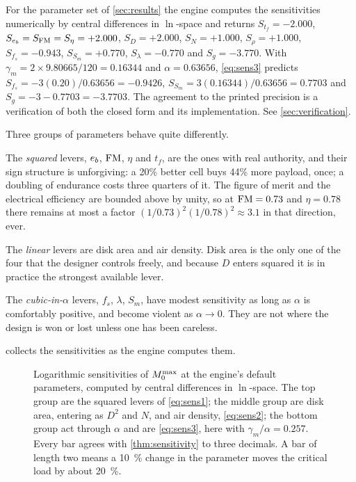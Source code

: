 \begin{example}
For the parameter set of \cref{sec:results} the engine computes the
sensitivities numerically by central differences in $\ln$-space and returns
$S_{t_f}=-2.000$, $S_{e_b}=S_{\mathrm{FM}}=S_{\eta}=+2.000$, $S_D=+2.000$, $S_N=+1.000$,
$S_\rho=+1.000$, $S_{f_s}=-0.943$, $S_{S_m}=+0.770$, $S_\lambda=-0.770$ and
$S_g=-3.770$. With $\gamma_m = 2\times 9.80665/120 = 0.16344$ and
$\alpha=0.63656$, \cref{eq:sens3} predicts
$S_{f_s} = -3(0.20)/0.63656 = -0.9426$,
$S_{S_m} = 3(0.16344)/0.63656 = 0.7703$ and
$S_g = -3-0.7703 = -3.7703$. The agreement to the printed precision is a
verification of both the closed form and its implementation. See
\cref{sec:verification}.
\end{example}

\begin{remark}
Three groups of parameters behave quite differently.

The \emph{squared} levers, $e_b$, $\mathrm{FM}$, $\eta$ and $t_f$, are the ones with
real authority, and their sign structure is unforgiving: a 20\% better cell
buys 44\% more payload, once; a doubling of endurance costs three quarters of
it. The figure of merit and the electrical efficiency are bounded above by
unity, so at $\mathrm{FM}=0.73$ and $\eta=0.78$ there remains at most a factor
$(1/0.73)^2(1/0.78)^2 \approx 3.1$ in that direction, ever.

The \emph{linear} levers are disk area and air density. Disk area is the only
one of the four that the designer controls freely, and because $D$ enters
squared it is in practice the strongest available lever.

The \emph{cubic-in-$\alpha$} levers, $f_s$, $\lambda$, $S_m$, have modest
sensitivity as long as $\alpha$ is comfortably positive, and become violent as
$\alpha\to0$. They are not where the design is won or lost unless one has been
careless.
\end{remark}

 collects the sensitivities as the engine computes them.

\begin{figure}[tbp]
\centering

\caption{Logarithmic sensitivities of $M_0^{\max}$ at the engine's default
parameters, computed by central differences in $\ln$-space. The top group are
the squared levers of \cref{eq:sens1}; the middle group are disk area, entering
as $D^2$ and $N$, and air density, \cref{eq:sens2}; the bottom group act
through $\alpha$ and are \cref{eq:sens3}, here with $\gamma_m/\alpha=0.257$.
Every bar agrees with \cref{thm:sensitivity} to three decimals. A bar of length
two means a \SI{10}{\percent} change in the parameter moves the critical load
by about \SI{20}{\percent}.}
\label{fig:sensitivity}
\end{figure}

